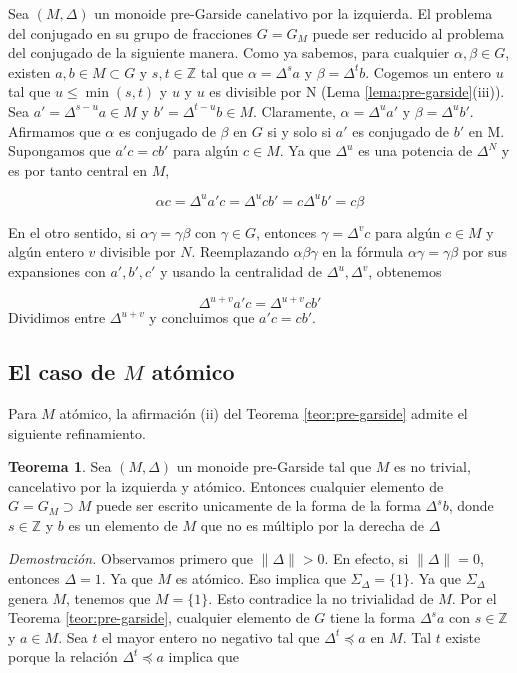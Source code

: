 \documentclass[12pt]{article}
\theoremstyle{definition}
\newtheorem{teor}{Teorema}[section]
\providecommand{\norm}[1]{\lVert#1\rVert}
\begin{document}
Sea $(M,\Delta)$ un monoide pre-Garside canelativo por la izquierda. El problema del conjugado en su grupo de fracciones $G=G_M$ puede ser reducido al problema del conjugado de la siguiente manera. Como ya sabemos, para cualquier $\alpha,\beta\in G$, existen $a,b\in M\subset G$ y $s,t\in\mathbb{Z}$ tal que $\alpha=\Delta^sa$ y $\beta=\Delta^t b$. Cogemos un entero $u$ tal que $u\leq \min(s,t)$ y $u$ y $u$ es divisible por N (Lema \ref{lema:pre-garside}(iii)). Sea $a'=\Delta^{s-u}a\in M$ y $b'=\Delta^{t-u}b\in M$. Claramente, $\alpha=\Delta^ua'$ y $\beta=\Delta^ub'$. Afirmamos que $\alpha$ es conjugado de $\beta$ en $G$ si y solo si $a'$ es conjugado de $b'$ en M. Supongamos que $a'c=cb'$ para algún $c\in M$. Ya que $\Delta^u$ es una potencia de $\Delta^N$ y es por tanto central en $M$,

$$\alpha c=\Delta^u a'c=\Delta^u c b' = c\Delta^u b'=c\beta$$

En el otro sentido, si $\alpha\gamma=\gamma\beta$ con $\gamma\in G$, entonces $\gamma=\Delta^v c$ para algún $c\in M$ y algún entero $v$ divisible por $N$. Reemplazando $\alpha\beta\gamma$ en la fórmula $\alpha\gamma=\gamma\beta$ por sus expansiones con $a',b',c'$ y usando la centralidad de $\Delta^u,\Delta^v$, obtenemos

$$\Delta^{u+v}a'c=\Delta^{u+v}cb'$$
\newline
Dividimos entre $\Delta^{u+v}$ y concluimos que $a'c=cb'$.

\subsection{El caso de $M$ atómico}

Para $M$ atómico, la afirmación (ii) del Teorema \ref{teor:pre-garside} admite el siguiente refinamiento.

\begin{teor}
Sea $(M,\Delta)$ un monoide pre-Garside tal que $M$ es no trivial, cancelativo por la izquierda y atómico. Entonces cualquier elemento de $G=G_M\supset M$ puede ser escrito unicamente de la forma de la forma $\Delta^s b$, donde $s\in\mathbb{Z}$ y $b$ es un elemento de $M$ que no es múltiplo por la derecha de $\Delta$
\end{teor}

\textit{Demostración.} Observamos primero que $\norm{\Delta}>0$. En efecto, si $\norm{\Delta}= 0$, entonces $\Delta=1$. Ya que $M$ es atómico. Eso implica que $\Sigma_\Delta=\{1\}$. Ya que $\Sigma_\Delta$ genera $M$, tenemos que $M=\{1\}$. Esto contradice la no trivialidad de $M$.
\newline
\newline
Por el Teorema \ref{teor:pre-garside}, cualquier elemento de $G$ tiene la forma $\Delta^sa$ con $s\in\mathbb{Z}$ y $a\in M$. Sea $t$ el mayor entero no negativo tal que $\Delta^t\preceq a$ en $M$. Tal $t$ existe porque la relación $\Delta^t\preceq a$ implica que
\end{document}
